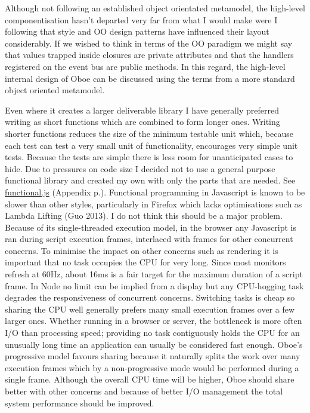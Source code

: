 \documentclass[]{article}
\begin{document}
Although not following an established object orientated metamodel, the
high-level componentisation hasn't departed very far from what I would
make were I following that style and OO design patterns have influenced
their layout considerably. If we wished to think in terms of the OO
paradigm we might say that values trapped inside closures are private
attributes and that the handlers registered on the event bus are public
methods. In this regard, the high-level internal design of Oboe can be
discussed using the terms from a more standard object oriented
metamodel.

Even where it creates a larger deliverable library I have generally
preferred writing as short functions which are combined to form longer
ones. Writing shorter functions reduces the size of the minimum testable
unit which, because each test can test a very small unit of
functionality, encourages very simple unit tests. Because the tests are
simple there is less room for unanticipated cases to hide. Due to
pressures on code size I decided not to use a general purpose functional
library and created my own with only the parts that are needed. See
\hyperref[functional.js]{functional.js} (Appendix
p.\pageref{functional.js}). Functional programming in Javascript is
known to be slower than other styles, particularly in Firefox which
lacks optimisations such as Lambda Lifting (Guo 2013). I do not think
this should be a major problem. Because of its single-threaded execution
model, in the browser any Javascript is ran during script execution
frames, interlaced with frames for other concurrent concerns. To
minimise the impact on other concerns such as rendering it is important
that no task occupies the CPU for very long. Since most monitors refresh
at 60Hz, about 16ms is a fair target for the maximum duration of a
script frame. In Node no limit can be implied from a display but any
CPU-hogging task degrades the responsiveness of concurrent concerns.
Switching tasks is cheap so sharing the CPU well generally prefers many
small execution frames over a few larger ones. Whether running in a
browser or server, the bottleneck is more often I/O than processing
speed; providing no task contiguously holds the CPU for an unusually
long time an application can usually be considered fast enough. Oboe's
progressive model favours sharing because it naturally splits the work
over many execution frames which by a non-progressive mode would be
performed during a single frame. Although the overall CPU time will be
higher, Oboe should share better with other concerns and because of
better I/O management the total system performance should be improved.
\end{document}
